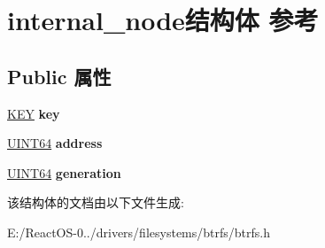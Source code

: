 \hypertarget{structinternal__node}{}\section{internal\+\_\+node结构体 参考}
\label{structinternal__node}
\subsection*{Public 属性}
\begin{DoxyCompactItemize}
\item 
\mbox{\label{structinternal__node_a01aeead2a642573421aaa35991598d1d}} 
\hyperlink{struct_k_e_y}{K\+EY} {\bfseries key}
\item 
\mbox{\label{structinternal__node_a53fc1f6e10f5afc207379447b4d5a0df}} 
\hyperlink{_processor_bind_8h_a57be03562867144161c1bfee95ca8f7c}{U\+I\+N\+T64} {\bfseries address}
\item 
\mbox{\label{structinternal__node_afb9a0cd60e00070defc27f0f66a165c4}} 
\hyperlink{_processor_bind_8h_a57be03562867144161c1bfee95ca8f7c}{U\+I\+N\+T64} {\bfseries generation}
\end{DoxyCompactItemize}


该结构体的文档由以下文件生成\+:\begin{DoxyCompactItemize}
\item 
E\+:/\+React\+O\+S-\/0../drivers/filesystems/btrfs/btrfs.\+h\end{DoxyCompactItemize}
